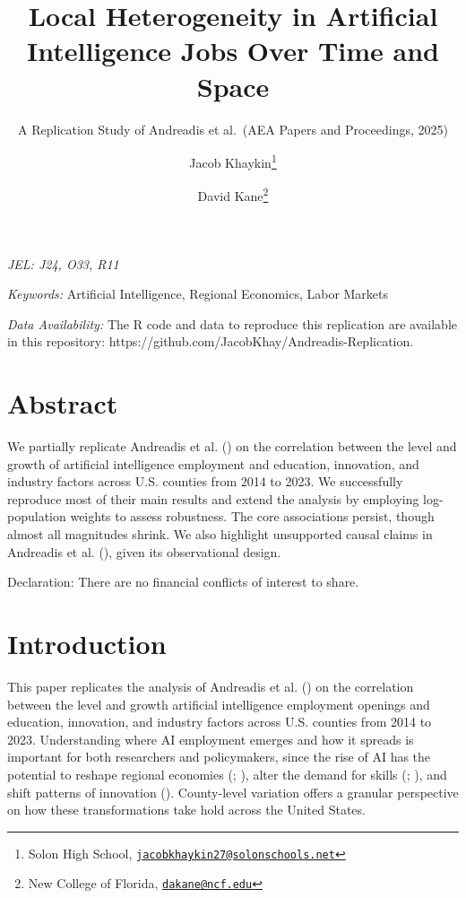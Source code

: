 \documentclass[
]{article}
\title{Local Heterogeneity in Artificial Intelligence Jobs Over Time and
Space}
\subtitle{A Replication Study of Andreadis et al.~(AEA Papers and
Proceedings, 2025)}
\author{Jacob Khaykin\footnote{Solon High School,
  \href{mailto:jacobkhaykin27@solonschools.net}{\nolinkurl{jacobkhaykin27@solonschools.net}}} \and David
Kane\footnote{New College of Florida,
  \href{mailto:dakane@ncf.edu}{\nolinkurl{dakane@ncf.edu}}}}
\date{}
\begin{document}
\maketitle


\emph{JEL: J24, O33, R11}

\emph{Keywords:} Artificial Intelligence, Regional Economics, Labor
Markets

\emph{Data Availability:} The R code and data to reproduce this
replication are available in this repository:
https://github.com/JacobKhay/Andreadis-Replication.

\section*{Abstract}\label{abstract}

We partially replicate Andreadis et al.
() on the correlation between the
level and growth of artificial intelligence employment and education,
innovation, and industry factors across U.S. counties from 2014 to 2023.
We successfully reproduce most of their main results and extend the
analysis by employing log-population weights to assess robustness. The
core associations persist, though almost all magnitudes shrink. We also
highlight unsupported causal claims in Andreadis et al.
(), given its observational design.

Declaration: There are no financial conflicts of interest to share.

\newpage

\section{Introduction}\label{introduction}

This paper replicates the analysis of Andreadis et al.
() on the correlation between the
level and growth artificial intelligence employment openings and
education, innovation, and industry factors across U.S. counties from
2014 to 2023. Understanding where AI employment emerges and how it
spreads is important for both researchers and policymakers, since the
rise of AI has the potential to reshape regional economies
(;
), alter the demand for skills
(;
), and shift patterns of innovation
(). County-level variation
offers a granular perspective on how these transformations take hold
across the United States.
\end{document}
